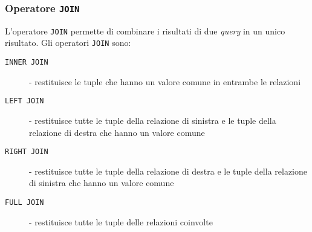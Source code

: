        \subsubsection{Operatore \texttt{JOIN}}
            L'operatore \texttt{JOIN} permette di combinare i risultati di due \textit{query} in un unico risultato. Gli operatori \texttt{JOIN} sono:
            \begin{description}
                \item[\texttt{INNER JOIN}] - restituisce le tuple che hanno un valore comune in entrambe le relazioni
                \item[\texttt{LEFT JOIN}] - restituisce tutte le tuple della relazione di sinistra e le tuple della relazione di destra che hanno un valore comune
                \item[\texttt{RIGHT JOIN}] - restituisce tutte le tuple della relazione di destra e le tuple della relazione di sinistra che hanno un valore comune
                \item[\texttt{FULL JOIN}] - restituisce tutte le tuple delle relazioni coinvolte
            \end{description}
